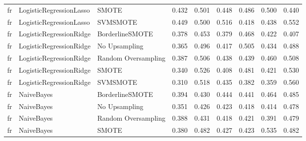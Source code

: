 \begin{tabular}{lllllllll}
      fr &      LogisticRegressionLasso &               SMOTE & 0.432 &                     0.501 &                 0.448 &                  0.486 &                                   0.500 &     0.440 \\
      fr &      LogisticRegressionLasso &            SVMSMOTE & 0.449 &                     0.500 &                 0.516 &                  0.418 &                                   0.438 &     0.552 \\
      fr &      LogisticRegressionRidge &     BorderlineSMOTE & 0.378 &                     0.453 &                 0.379 &                  0.468 &                                   0.422 &     0.407 \\
      fr &      LogisticRegressionRidge &       No Upsampling & 0.365 &                     0.496 &                 0.417 &                  0.505 &                                   0.434 &     0.488 \\
      fr &      LogisticRegressionRidge & Random Oversampling & 0.387 &                     0.506 &                 0.438 &                  0.439 &                                   0.460 &     0.508 \\
      fr &      LogisticRegressionRidge &               SMOTE & 0.340 &                     0.526 &                 0.408 &                  0.481 &                                   0.421 &     0.530 \\
      fr &      LogisticRegressionRidge &            SVMSMOTE & 0.310 &                     0.518 &                 0.435 &                  0.382 &                                   0.359 &     0.560 \\
      fr &                   NaiveBayes &     BorderlineSMOTE & 0.394 &                     0.430 &                 0.444 &                  0.441 &                                   0.464 &     0.485 \\
      fr &                   NaiveBayes &       No Upsampling & 0.351 &                     0.426 &                 0.423 &                  0.418 &                                   0.414 &     0.478 \\
      fr &                   NaiveBayes & Random Oversampling & 0.388 &                     0.431 &                 0.418 &                  0.421 &                                   0.391 &     0.479 \\
      fr &                   NaiveBayes &               SMOTE & 0.380 &                     0.482 &                 0.427 &                  0.423 &                                   0.535 &     0.482 \\

\end{tabular}
